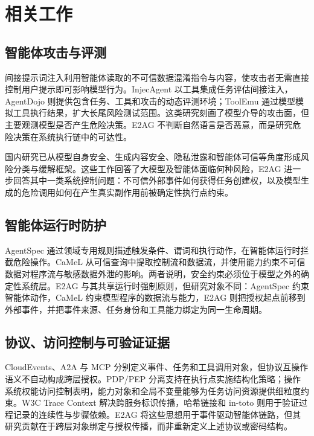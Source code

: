 \section{相关工作}\label{sec:related-v1}

\subsection{智能体攻击与评测}

间接提示词注入利用智能体读取的不可信数据混淆指令与内容，使攻击者无需直接控制用户提示即可影响模型行为\cite{indirect-pi}。InjecAgent 以工具集成任务评估间接注入，AgentDojo 则提供包含任务、工具和攻击的动态评测环境\cite{injecagent,agentdojo}；ToolEmu 通过模型模拟工具执行结果，扩大长尾风险测试范围\cite{toolemu}。这类研究刻画了模型介导的攻击面，但主要观测模型是否产生危险决策。E2AG 不判断自然语言是否恶意，而是研究危险决策在系统执行链中的可达性。

国内研究已从模型自身安全、生成内容安全、隐私泄露和智能体可信等角度形成风险分类与缓解框架\cite{huang-llm-safety,mu-llm-security,zhang-agent-security}。这些工作回答了大模型及智能体面临何种风险，E2AG 进一步回答其中一类系统控制问题：不可信外部事件如何获得任务创建权，以及模型生成的危险调用如何在产生真实副作用前被确定性执行点约束。

\subsection{智能体运行时防护}

AgentSpec 通过领域专用规则描述触发条件、谓词和执行动作，在智能体运行时拦截危险操作\cite{agentspec}。CaMeL 从可信查询中提取控制流和数据流，并使用能力约束不可信数据对程序流与敏感数据外泄的影响\cite{camel}。两者说明，安全约束必须位于模型之外的确定性系统层。E2AG 与其共享运行时强制原则，但研究对象不同：AgentSpec 约束智能体动作，CaMeL 约束模型程序的数据流与能力，E2AG 则把授权起点前移到外部事件，并把事件来源、任务身份和工具能力绑定为同一生命周期。

\subsection{协议、访问控制与可验证证据}

CloudEvents、A2A 与 MCP 分别定义事件、任务和工具调用对象，但协议互操作语义不自动构成跨层授权\cite{cloudevents,a2a,mcp}。PDP/PEP 分离支持在执行点实施结构化策略\cite{opa}；操作系统权能访问控制表明，能力对象和全局不变量能够为任务访问资源提供细粒度约束\cite{cap-os}。W3C Trace Context 解决跨服务标识传播，哈希链接和 in-toto 则用于验证过程记录的连续性与步骤依赖\cite{trace-context,haber-stornetta,in-toto}。E2AG 将这些思想用于事件驱动智能体链路，但其研究贡献在于跨层对象绑定与授权传播，而非重新定义上述协议或密码结构。

